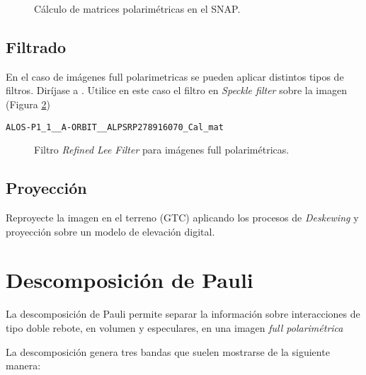 \begin{figure}[h!]
    \centering
    \hspace{1cm}
    \caption{Cálculo de matrices polarimétricas en el SNAP.}
    \label{fig:t3}
\end{figure}

\subsection{Filtrado}

En el caso de imágenes full polarimetricas se pueden aplicar distintos tipos de filtros. Diríjase a . Utilice en este caso el filtro  en \emph{Speckle filter} sobre la imagen (Figura \ref{fig:plee})
\begin{center} \texttt{ALOS-P1\_1\_\_A-ORBIT\_\_ALPSRP278916070\_Cal\_mat}\end{center}

\begin{figure}[h!]
    \centering
    \hspace{1cm}
    \caption{Filtro \emph{Refined Lee Filter} para imágenes full polarimétricas.}
    \label{fig:plee}
\end{figure}

\subsection{Proyección}

Reproyecte la imagen en el terreno (GTC) aplicando los procesos de \emph{Deskewing} y proyección sobre un modelo de elevación digital.

\section{Descomposición de Pauli}

La descomposición de Pauli permite separar la información sobre interacciones de tipo doble rebote, en volumen y especulares, en una imagen \emph{full polarimétrica}

La descomposición genera tres bandas que suelen mostrarse de la siguiente manera:

